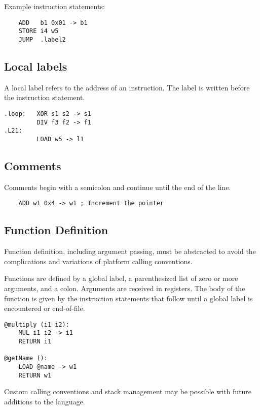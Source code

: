 Example instruction statements:

\begin{verbatim}
    ADD   b1 0x01 -> b1
    STORE i4 w5
    JUMP  .label2
\end{verbatim}

\subsection{Local labels}

A local label refers to the address of an instruction.
The label is written before the instruction statement.

\begin{verbatim}
.loop:   XOR s1 s2 -> s1
         DIV f3 f2 -> f1
.L21:
         LOAD w5 -> l1
\end{verbatim}

\subsection{Comments}

Comments begin with a semicolon and continue until the end of the line.

\begin{verbatim}
    ADD w1 0x4 -> w1 ; Increment the pointer
\end{verbatim}

\subsection{Function Definition}

Function definition, including argument passing, must be abstracted to avoid
the complications and variations of platform calling conventions.

Functions are defined by a global label, a parenthesized list of zero
or more arguments, and a colon. Arguments are received in registers.
The body of the function is given by the instruction statements that follow
until a global label is encountered or end-of-file.

\begin{verbatim}
@multiply (i1 i2):
    MUL i1 i2 -> i1
    RETURN i1

@getName ():
    LOAD @name -> w1
    RETURN w1
\end{verbatim}

Custom calling conventions and stack management may
be possible with future additions to the language.
